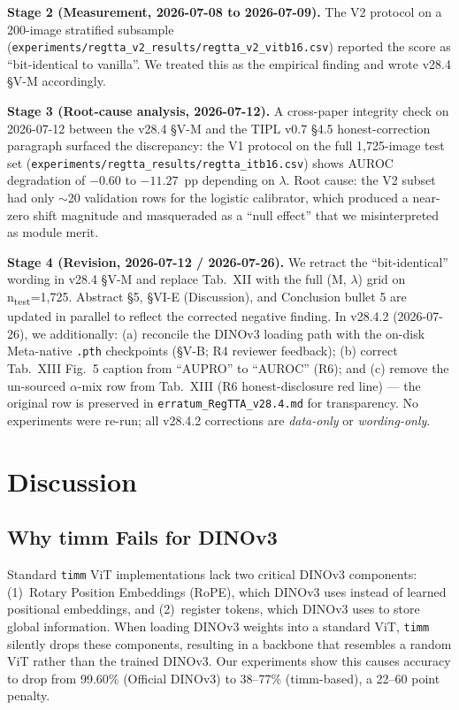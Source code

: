 \documentclass[journal]{IEEEtran}
\begin{document}
\textbf{Stage 2 (Measurement, 2026-07-08 to 2026-07-09).} The V2 protocol on a 200-image stratified subsample (\texttt{experiments/regtta\_v2\_results/regtta\_v2\_vitb16.csv}) reported the score as ``bit-identical to vanilla''. We treated this as the empirical finding and wrote v28.4 \S V-M accordingly.

\textbf{Stage 3 (Root-cause analysis, 2026-07-12).} A cross-paper integrity check on 2026-07-12 between the v28.4 \S V-M and the TIPL v0.7 \S 4.5 honest-correction paragraph surfaced the discrepancy: the V1 protocol on the full 1{,}725-image test set (\texttt{experiments/regtta\_results/regtta\_itb16.csv}) shows AUROC degradation of $-0.60$ to $-11.27$~pp depending on $\lambda$. Root cause: the V2 subset had only $\sim$20 validation rows for the logistic calibrator, which produced a near-zero shift magnitude and masqueraded as a ``null effect'' that we misinterpreted as module merit.

\textbf{Stage 4 (Revision, 2026-07-12 / 2026-07-26).} We retract the ``bit-identical'' wording in v28.4 \S V-M and replace Tab.~XII with the full (M, $\lambda$) grid on n\textsubscript{test}=1{,}725. Abstract \S 5, \S VI-E (Discussion), and Conclusion bullet 5 are updated in parallel to reflect the corrected negative finding. In v28.4.2 (2026-07-26), we additionally: (a) reconcile the DINOv3 loading path with the on-disk Meta-native \texttt{.pth} checkpoints (§V-B; R4 reviewer feedback); (b) correct Tab.~XIII Fig.~5 caption from ``AUPRO'' to ``AUROC'' (R6); and (c) remove the un-sourced $\alpha$-mix row from Tab.~XIII (R6 honest-disclosure red line) — the original row is preserved in \texttt{erratum\_RegTTA\_v28.4.md} for transparency. No experiments were re-run; all v28.4.2 corrections are \emph{data-only} or \emph{wording-only}.

\section{Discussion}

\subsection{Why timm Fails for DINOv3}
Standard \texttt{timm} ViT implementations lack two critical DINOv3 components: (1)~Rotary Position Embeddings (RoPE), which DINOv3 uses instead of learned positional embeddings, and (2)~register tokens, which DINOv3 uses to store global information. When loading DINOv3 weights into a standard ViT, \texttt{timm} silently drops these components, resulting in a backbone that resembles a random ViT rather than the trained DINOv3. Our experiments show this causes accuracy to drop from 99.60\% (Official DINOv3) to 38--77\% (timm-based), a 22--60 point penalty.
\end{document}
